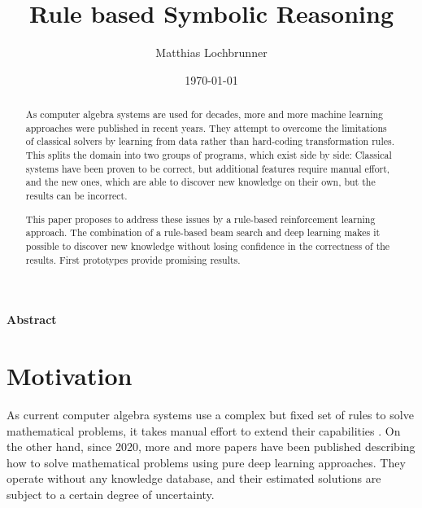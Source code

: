 \documentclass{scrartcl}
\title{Rule based Symbolic Reasoning}
\author{Matthias Lochbrunner}
\date{\today}
\theoremstyle{definition}
\begin{document}
\maketitle
\begin{center}
	\textbf{Abstract}
\end{center}
\begin{abstract}
    As computer algebra systems are used for decades, more and more machine learning approaches were published in recent years.
    They attempt to overcome the limitations of classical solvers by learning from data rather than hard-coding transformation rules.
    This splits the domain into two groups of programs, which exist side by side:
    Classical systems have been proven to be correct, but additional features require manual effort, and the new ones,
    which are able to discover new knowledge on their own, but the results can be incorrect.

    This paper proposes to address these issues by a rule-based reinforcement learning approach.
    The combination of a rule-based beam search and deep learning makes it possible to discover new knowledge without losing confidence in the correctness of the results.
    First prototypes provide promising results. 
	
\end{abstract}

\section{Motivation}

As current computer algebra systems use a complex but fixed set of rules to solve mathematical problems,
it takes manual effort to extend their capabilities \cite{wolfram}.
On the other hand, since 2020, more and more papers have been published describing how to solve mathematical problems using pure deep learning approaches.
They operate without any knowledge database, and their estimated solutions are subject to a certain degree of uncertainty.
\end{document}
